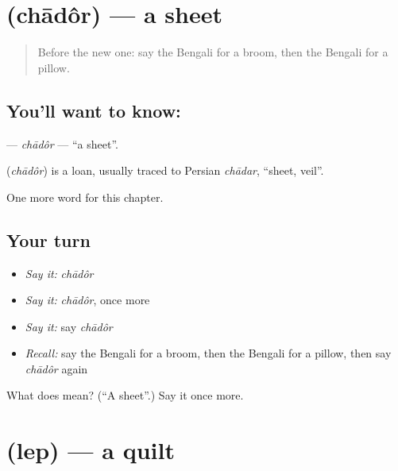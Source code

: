 \section[\texorpdfstring{\bn{চাদর} (chādôr)}{চাদর (chādôr)}]{ (chādôr) — a sheet}

\label{lesson:BN-C108-chador}



\begin{quote}
Before the new one: say the Bengali for a broom, then the Bengali for a pillow.
\end{quote}

\subsection*{You'll want to know: }
\textbf{} — \emph{chādôr} — \textquotedblleft{}a sheet\textquotedblright{}.

\begin{cousinweb}
\textbf{} (\emph{chādôr}) is a loan, usually traced to Persian \emph{chādar}, \textquotedblleft{}sheet, veil\textquotedblright{}.
\end{cousinweb}

\begin{grammarlens}[title={What you've built}]
One more word for this chapter.
\end{grammarlens}

\subsection*{Your turn}
\begin{itemize}
\raggedright
  \item \emph{Say it:} \emph{chādôr}
  \item \emph{Say it:} \emph{chādôr}, once more
  \item \emph{Say it:} say \emph{chādôr}
  \item \emph{Recall:} say the Bengali for a broom, then the Bengali for a pillow, then say \emph{chādôr} again
\end{itemize}

\begin{tcolorbox}[breakable,colback=teal!4,colframe=teal!35!black,title={Before you move on}]
What does  mean? (\textquotedblleft{}A sheet\textquotedblright{}.) Say it once more.
\end{tcolorbox}
\section[\texorpdfstring{\bn{লেপ} (lep)}{লেপ (lep)}]{ (lep) — a quilt}

